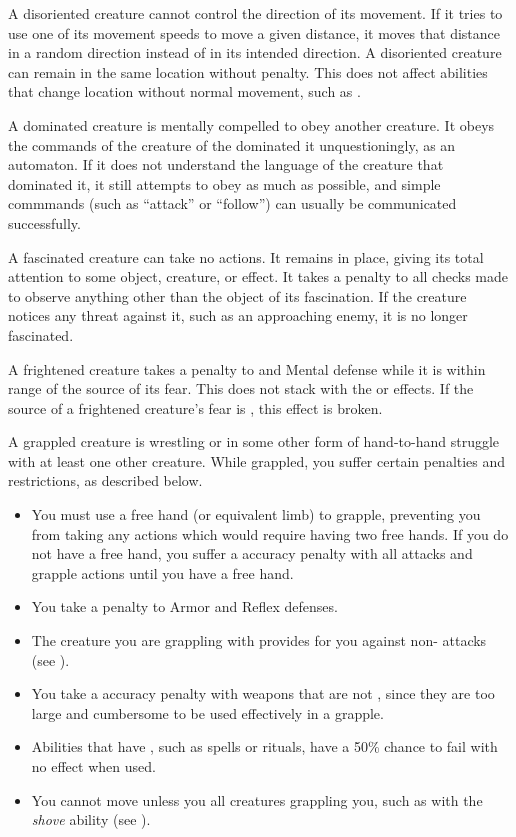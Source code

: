  A disoriented creature cannot control the direction of its movement.
If it tries to use one of its movement speeds to move a given distance, it moves that distance in a random direction instead of in its intended direction.
A disoriented creature can remain in the same location without penalty.
This does not affect abilities that change location without normal movement, such as .

 A dominated creature is mentally compelled to obey another creature.
It obeys the commands of the creature of the dominated it unquestioningly, as an automaton.
If it does not understand the language of the creature that dominated it, it still attempts to obey as much as possible, and simple commmands (such as ``attack'' or ``follow'') can usually be communicated successfully.

 A fascinated creature can take no actions. It remains in place, giving its total attention to some object, creature, or effect. It takes a  penalty to all checks made to observe anything other than the object of its fascination.
If the creature notices any threat against it, such as an approaching enemy, it is no longer fascinated.

 A frightened creature takes a  penalty to  and Mental defense while it is within \rngmed range of the source of its fear.
This does not stack with the \shaken or \panicked effects.
If the source of a frightened creature's fear is , this effect is broken.

 A grappled creature is wrestling or in some other form of hand-to-hand struggle with at least one other creature.
While grappled, you suffer certain penalties and restrictions, as described below.
\begin{itemize}
    \item You must use a free hand (or equivalent limb) to grapple, preventing you from taking any actions which would require having two free hands.
        If you do not have a free hand, you suffer a  accuracy penalty with all  attacks and grapple actions until you have a free hand.
    \item You take a  penalty to Armor and Reflex defenses.
    \item The creature you are grappling with provides  for you against non- attacks (see ).
    \item You take a  accuracy penalty with weapons that are not , since they are too large and cumbersome to be used effectively in a grapple.
    \item Abilities that have , such as spells or rituals, have a 50\% chance to fail with no effect when used.
    \item You cannot move unless you  all creatures grappling you, such as with the \textit{shove} ability (see ).
\end{itemize}

